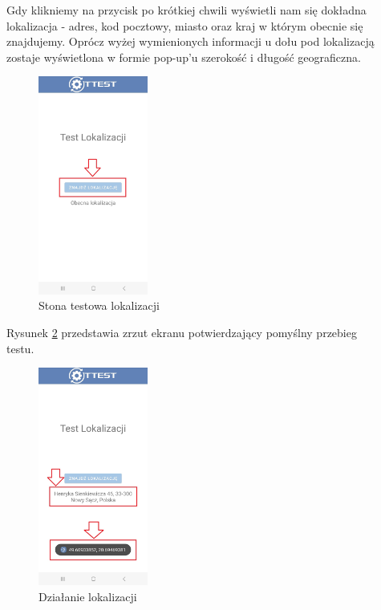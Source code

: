 Gdy klikniemy na przycisk po krótkiej chwili wyświetli nam się dokładna lokalizacja - adres, kod pocztowy, miasto oraz kraj w którym obecnie się znajdujemy. Oprócz wyżej wymienionych informacji u dołu pod lokalizacją zostaje wyświetlona w formie pop-up'u szerokość i długość geograficzna.

\newpage

\begin{figure}[!hbt]
	\begin{center}
		\includegraphics[angle=360, width=0.32\textwidth]{rys/punkt6/gps}
		\caption{Stona testowa lokalizacji}
		\label{rys:gps}
	\end{center}
\end{figure}

Rysunek \ref{rys:gps1} przedstawia zrzut ekranu potwierdzający pomyślny przebieg \\ testu.

\begin{figure}[!hbt]
	\begin{center}
		\includegraphics[angle=360, width=0.32\textwidth]{rys/punkt6/gps1}
		\caption{Działanie lokalizacji}
		\label{rys:gps1}
	\end{center}
\end{figure}

